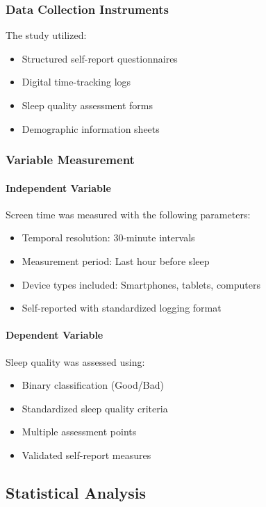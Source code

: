 \documentclass[conference]{IEEEtran}
\begin{document}
\subsubsection{Data Collection Instruments}
The study utilized:
\begin{itemize}
\item Structured self-report questionnaires
\item Digital time-tracking logs
\item Sleep quality assessment forms
\item Demographic information sheets
\end{itemize}

\subsubsection{Variable Measurement}
\paragraph{Independent Variable}
Screen time was measured with the following parameters:
\begin{itemize}
\item Temporal resolution: 30-minute intervals
\item Measurement period: Last hour before sleep
\item Device types included: Smartphones, tablets, computers
\item Self-reported with standardized logging format
\end{itemize}

\paragraph{Dependent Variable}
Sleep quality was assessed using:
\begin{itemize}
\item Binary classification (Good/Bad)
\item Standardized sleep quality criteria
\item Multiple assessment points
\item Validated self-report measures
\end{itemize}

\subsection{Statistical Analysis}
\end{document}
